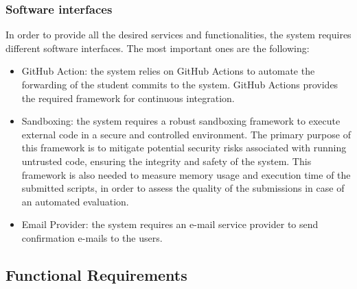 \subsubsection{Software interfaces}
In order to provide all the desired services and functionalities, the system requires different software interfaces. The most important ones are the following:
\begin{itemize}
    \item
    GitHub Action: the system relies on GitHub Actions to automate the forwarding of the student commits to the system. GitHub Actions provides the required framework for continuous integration.
    \item
    Sandboxing: the system requires a robust sandboxing framework to execute external code in a secure and controlled environment. The primary purpose of this framework is to mitigate potential security risks associated with running untrusted code, ensuring the integrity and safety of the system. This framework is also needed to measure memory usage and execution time of the submitted scripts, in order to assess the quality of the submissions in case of an automated evaluation.
    \item
    Email Provider: the system requires an e-mail service provider to send confirmation e-mails to the users.
\end{itemize}

\subsection{Functional Requirements}

